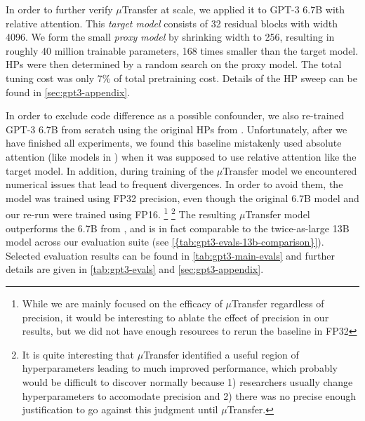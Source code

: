 \documentclass{article}
\theoremstyle{definition}
\begin{document}
In order to further verify $\mu$Transfer at scale, we applied it to GPT-3 6.7B \cite{brown2020language} with relative attention.
This \emph{target model} consists of 32 residual blocks with width 4096.
We form the small \emph{proxy model} by shrinking width to 256, resulting in roughly 40 million trainable parameters, 168 times smaller than the target model.
HPs were then determined by a random search on the proxy model.
The total tuning cost was only 7\% of total pretraining cost.
Details of the HP sweep can be found in \cref{sec:gpt3-appendix}.

In order to exclude code difference as a possible confounder, we also re-trained GPT-3 6.7B from scratch using the original HPs from \cite{brown2020language}.
Unfortunately, after we have finished all experiments, we found this baseline mistakenly used absolute attention (like models in \cite{brown2020language}) when it was supposed to use relative attention like the target model.
In addition, during training of the $\mu$Transfer model we encountered numerical issues that lead to frequent divergences.
In order to avoid them, the model was trained using FP32 precision, even though the original 6.7B model and our re-run were trained using FP16.%
\footnote{
  While we are mainly focused on the efficacy of $\mu$Transfer regardless of precision, it would be interesting to ablate the effect of precision in our results, but we did not have enough resources to rerun the baseline in FP32}
\footnote{
  It is quite interesting that $\mu$Transfer identified a useful region of hyperparameters leading to much improved performance, which probably would be difficult to discover normally because 1) researchers usually change hyperparameters to accomodate precision and 2) there was no precise enough justification to go against this judgment until $\mu$Transfer.
}
The resulting $\mu$Transfer model outperforms the 6.7B from \cite{brown2020language}, and is in fact comparable to the twice-as-large 13B model across our evaluation suite (see \cref{{tab:gpt3-evals-13b-comparison}}).
Selected evaluation results can be found in \cref{tab:gpt3-main-evals} and further details are given in \cref{tab:gpt3-evals} and \cref{sec:gpt3-appendix}.
\end{document}
